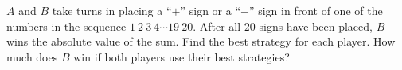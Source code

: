 $A$ and $B$ take turns in placing a ``$+$'' sign or a ``$-$'' sign in front of one of the numbers in the sequence $1\ 2\ 3\ 4 \cdots 19\ 20$. After all $20$ signs have been placed, $B$ wins the absolute value of the sum. Find the best strategy for each player. How much does $B$ win if both players use their best strategies?
